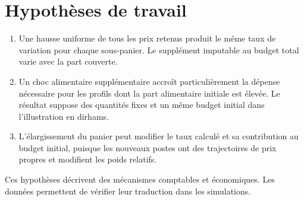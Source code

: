 \section*{Hypothèses de travail}
\begin{enumerate}
\item Une hausse uniforme de tous les prix retenus produit le même taux de variation pour chaque sous-panier. Le supplément imputable au budget total varie avec la part couverte.
\item Un choc alimentaire supplémentaire accroît particulièrement la dépense nécessaire pour les profils dont la part alimentaire initiale est élevée. Le résultat suppose des quantités fixes et un même budget initial dans l'illustration en dirhams.
\item L'élargissement du panier peut modifier le taux calculé et sa contribution au budget initial, puisque les nouveaux postes ont des trajectoires de prix propres et modifient les poids relatifs.
\end{enumerate}
Ces hypothèses décrivent des mécanismes comptables et économiques. Les données permettent de vérifier leur traduction dans les simulations.
